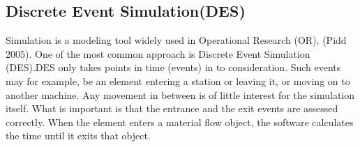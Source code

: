 \subsection{Discrete Event Simulation(DES)}
Simulation is a modeling tool widely used in Operational Research (OR), (Pidd 2005). One of the most common approach is Discrete Event Simulation (DES).DES only takes points in time (events) in to consideration. Such events may for example, be an element entering a station or leaving it, or moving on to another machine. Any movement in between is of little interest for the simulation itself. What is important is that the entrance and the exit events are assessed correctly. When the element enters a material flow object, the software calculates the time until it exits that object. 
